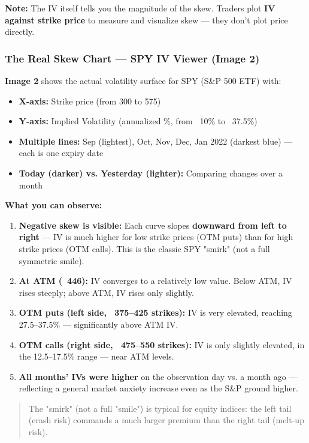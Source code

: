 \documentclass[12pt,openany]{book}
\begin{document}
\textbf{Note:} The IV itself tells you the magnitude of the skew. Traders plot \textbf{IV against strike price} to measure and visualize skew — they don't plot price directly.

\subsubsection{The Real Skew Chart — SPY IV Viewer (Image 2)}

\textbf{Image 2} shows the actual volatility surface for SPY (S\&P 500 ETF) with:
\begin{itemize}[leftmargin=*]
    \item \textbf{X-axis:} Strike price (from 300 to 575)
    \item \textbf{Y-axis:} Implied Volatility (annualized \%, from ~10\% to ~37.5\%)
    \item \textbf{Multiple lines:} Sep (lightest), Oct, Nov, Dec, Jan 2022 (darkest blue) — each is one expiry date
    \item \textbf{Today (darker) vs. Yesterday (lighter):} Comparing changes over a month
\end{itemize}

\textbf{What you can observe:}
\begin{enumerate}[leftmargin=*]
    \item \textbf{Negative skew is visible:} Each curve slopes \textbf{downward from left to right} — IV is much higher for low strike prices (OTM puts) than for high strike prices (OTM calls). This is the classic SPY "smirk" (not a full symmetric smile).
    \item \textbf{At ATM (~446):} IV converges to a relatively low value. Below ATM, IV rises steeply; above ATM, IV rises only slightly.
    \item \textbf{OTM puts (left side, ~375–425 strikes):} IV is very elevated, reaching 27.5–37.5\% — significantly above ATM IV.
    \item \textbf{OTM calls (right side, ~475–550 strikes):} IV is only slightly elevated, in the 12.5–17.5\% range — near ATM levels.
    \item \textbf{All months' IVs were higher} on the observation day vs. a month ago — reflecting a general market anxiety increase even as the S\&P ground higher.
\end{enumerate}

\begin{quote}
The "smirk" (not a full "smile") is typical for equity indices: the left tail (crash risk) commands a much larger premium than the right tail (melt-up risk).
\end{quote}
\end{document}
